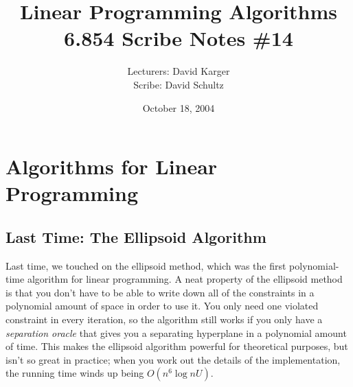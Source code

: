 \documentclass{article}
\title{Linear Programming Algorithms\\ 6.854 Scribe Notes \#14}
\date{October 18, 2004}
\author{Lecturers: David Karger\\ Scribe: David Schultz}
\begin{document}
%
%
%
%

%




\section{Algorithms for Linear Programming}

\subsection{Last Time: The Ellipsoid Algorithm}

Last time, we touched on the ellipsoid method, which was the first
polynomial-time algorithm for linear programming.  A neat property of
the ellipsoid method is that you don't have to be able to write down
all of the constraints in a polynomial amount of space in order to use
it.  You only need one violated constraint in every iteration, so the
algorithm still works if you only have a \textit{separation oracle}
that gives you a separating hyperplane in a polynomial amount of time.
This makes the ellipsoid algorithm powerful for theoretical purposes,
but isn't so great in practice; when you work out the details of the
implementation, the running time winds up being $O(n^6\log nU)$.
\end{document}
